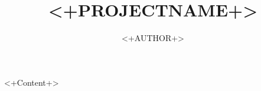 \documentclass[article]{memoir}
\title{<+PROJECTNAME+>}
\author{<+AUTHOR+>}
\begin{document}
\maketitle

<+Content+>
\end{document}

